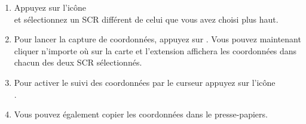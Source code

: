 \begin{enumerate}
  \item Appuyez sur l'icône\\  et sélectionnez un SCR différent de celui que vous avez choisi plus haut.
  \item Pour lancer la capture de coordonnées, appuyez sur . Vous pouvez maintenant cliquer n'importe où sur la carte et l'extension affichera les coordonnées dans chacun des deux SCR sélectionnés.
  \item Pour activer le suivi des coordonnées par le curseur appuyez sur l'icône\\ .
  \item Vous pouvez également copier les coordonnées dans le presse-papiers.
\end{enumerate}

\FloatBarrier
